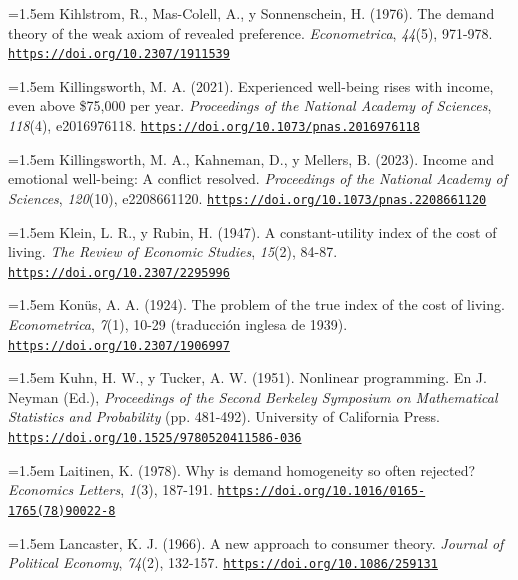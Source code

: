 \documentclass[10pt,a4paper]{article}
\begin{document}
\noindent\hangindent=1.5em Kihlstrom, R., Mas-Colell, A., y Sonnenschein, H. (1976). The demand theory of the weak axiom of revealed preference. \textit{Econometrica}, \textit{44}(5), 971-978. \href{https://doi.org/10.2307/1911539}{\nolinkurl{https://doi.org/10.2307/1911539}}

\noindent\hangindent=1.5em Killingsworth, M. A. (2021). Experienced well-being rises with income, even above \$75,000 per year. \textit{Proceedings of the National Academy of Sciences}, \textit{118}(4), e2016976118. \href{https://doi.org/10.1073/pnas.2016976118}{\nolinkurl{https://doi.org/10.1073/pnas.2016976118}}

\noindent\hangindent=1.5em Killingsworth, M. A., Kahneman, D., y Mellers, B. (2023). Income and emotional well-being: A conflict resolved. \textit{Proceedings of the National Academy of Sciences}, \textit{120}(10), e2208661120. \href{https://doi.org/10.1073/pnas.2208661120}{\nolinkurl{https://doi.org/10.1073/pnas.2208661120}}

\noindent\hangindent=1.5em Klein, L. R., y Rubin, H. (1947). A constant-utility index of the cost of living. \textit{The Review of Economic Studies}, \textit{15}(2), 84-87. \href{https://doi.org/10.2307/2295996}{\nolinkurl{https://doi.org/10.2307/2295996}}

\noindent\hangindent=1.5em Konüs, A. A. (1924). The problem of the true index of the cost of living. \textit{Econometrica}, \textit{7}(1), 10-29 (traducción inglesa de 1939). \href{https://doi.org/10.2307/1906997}{\nolinkurl{https://doi.org/10.2307/1906997}}

\noindent\hangindent=1.5em Kuhn, H. W., y Tucker, A. W. (1951). Nonlinear programming. En J. Neyman (Ed.), \textit{Proceedings of the Second Berkeley Symposium on Mathematical Statistics and Probability} (pp. 481-492). University of California Press. \href{https://doi.org/10.1525/9780520411586-036}{\nolinkurl{https://doi.org/10.1525/9780520411586-036}}

\noindent\hangindent=1.5em Laitinen, K. (1978). Why is demand homogeneity so often rejected? \textit{Economics Letters}, \textit{1}(3), 187-191. \href{https://doi.org/10.1016/0165-1765(78)90022-8}{\nolinkurl{https://doi.org/10.1016/0165-1765(78)90022-8}}

\noindent\hangindent=1.5em Lancaster, K. J. (1966). A new approach to consumer theory. \textit{Journal of Political Economy}, \textit{74}(2), 132-157. \href{https://doi.org/10.1086/259131}{\nolinkurl{https://doi.org/10.1086/259131}}
\end{document}
